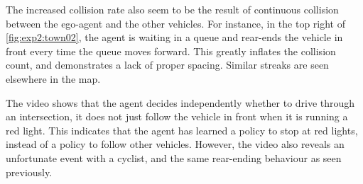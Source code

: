 The increased collision rate also seem to be the result of continuous collision between the ego-agent and the other vehicles.
For instance, in the top right of \cref{fig:exp2:town02},
the agent is waiting in a queue and rear-ends the vehicle in front
every time the queue moves forward.
This greatly inflates the collision count,
and demonstrates a lack of proper spacing.
Similar streaks are seen elsewhere in the map.

The video shows that the agent decides independently whether to drive through an intersection,
it does not just follow the vehicle in front when it is running a red light.
This indicates that the agent has learned
a policy to stop at red lights,
instead of a policy to follow other vehicles.
However, the video also reveals an unfortunate event with a cyclist,
and the same rear-ending behaviour as seen previously.
